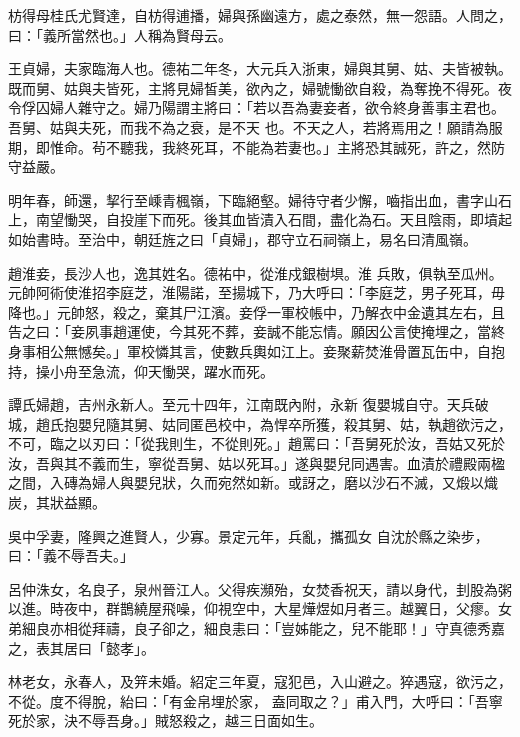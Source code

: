 \begin{pinyinscope}
 枋得母桂氏尤賢達，自枋得逋播，婦與孫幽遠方，處之泰然，無一怨語。人問之，曰：「義所當然也。」人稱為賢母云。



 王貞婦，夫家臨海人也。德祐二年冬，大元兵入浙東，婦與其舅、姑、夫皆被執。既而舅、姑與夫皆死，主將見婦皙美，欲內之，婦號慟欲自殺，為奪挽不得死。夜令俘囚婦人雜守之。婦乃陽謂主將曰：「若以吾為妻妾者，欲令終身善事主君也。吾舅、姑與夫死，而我不為之衰，是不天
 也。不天之人，若將焉用之！願請為服期，即惟命。茍不聽我，我終死耳，不能為若妻也。」主將恐其誠死，許之，然防守益嚴。



 明年春，師還，挈行至嵊青楓嶺，下臨絕壑。婦待守者少懈，嚙指出血，書字山石上，南望慟哭，自投崖下而死。後其血皆漬入石間，盡化為石。天且陰雨，即墳起如始書時。至治中，朝廷旌之曰「貞婦」，郡守立石祠嶺上，易名曰清風嶺。



 趙淮妾，長沙人也，逸其姓名。德祐中，從淮戍銀樹埧。淮
 兵敗，俱執至瓜州。元帥阿術使淮招李庭芝，淮陽諾，至揚城下，乃大呼曰：「李庭芝，男子死耳，毋降也。」元帥怒，殺之，棄其尸江濱。妾俘一軍校帳中，乃解衣中金遺其左右，且告之曰：「妾夙事趙運使，今其死不葬，妾誠不能忘情。願因公言使掩埋之，當終身事相公無憾矣。」軍校憐其言，使數兵輿如江上。妾聚薪焚淮骨置瓦缶中，自抱持，操小舟至急流，仰天慟哭，躍水而死。



 譚氏婦趙，吉州永新人。至元十四年，江南既內附，永新
 復嬰城自守。天兵破城，趙氏抱嬰兒隨其舅、姑同匿邑校中，為悍卒所獲，殺其舅、姑，執趙欲污之，不可，臨之以刃曰：「從我則生，不從則死。」趙罵曰：「吾舅死於汝，吾姑又死於汝，吾與其不義而生，寧從吾舅、姑以死耳。」遂與嬰兒同遇害。血漬於禮殿兩楹之間，入磚為婦人與嬰兒狀，久而宛然如新。或訝之，磨以沙石不滅，又煅以熾炭，其狀益顯。



 吳中孚妻，隆興之進賢人，少寡。景定元年，兵亂，攜孤女
 自沈於縣之染步，曰：「義不辱吾夫。」



 呂仲洙女，名良子，泉州晉江人。父得疾瀕殆，女焚香祝天，請以身代，刲股為粥以進。時夜中，群鵲繞屋飛噪，仰視空中，大星燁煜如月者三。越翼日，父瘳。女弟細良亦相從拜禱，良子卻之，細良恚曰：「豈姊能之，兒不能耶！」守真德秀嘉之，表其居曰「懿孝」。



 林老女，永春人，及笄未婚。紹定三年夏，寇犯邑，入山避之。猝遇寇，欲污之，不從。度不得脫，紿曰：「有金帛埋於家，
 盍同取之？」甫入門，大呼曰：「吾寧死於家，決不辱吾身。」賊怒殺之，越三日面如生。




\end{pinyinscope}

